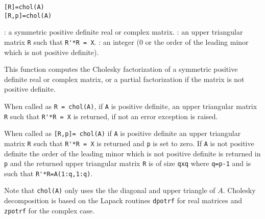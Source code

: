 
\begin{mandesc}
\end{mandesc}

\begin{calling_sequence}
\begin{verbatim}
[R]=chol(A)
[R,p]=chol(A)
\end{verbatim}
\end{calling_sequence}
\begin{parameters}
  \begin{varlist}
    : a symmetric positive definite real or complex matrix. 
    : an upper triangular matrix \verb+R+ such that \verb+R'*R = X+.
    : an integer (0 or the order of the leading minor which is 
not positive definite).
  \end{varlist}
\end{parameters}

\begin{mandescription}
This function computes the Cholesky factorization of a symmetric positive 
definite real or complex matrix, or a partial factorization if the matrix is not 
positive definite.

When called as \verb+R = chol(A)+, if \verb+A+ is positive definite, an upper triangular 
matrix \verb+R+ such that \verb+R'*R = X+ is returned, if not an error exception is 
raised.

When called as \verb+[R,p]= chol(A)+ if \verb+A+ is positive definite an upper triangular 
matrix \verb+R+ such that \verb+R'*R = X+ is returned and \verb+p+ is set to zero. 
If \verb+A+ is not positive definite the order of the leading minor which is 
not positive definite is returned in \verb+p+ and the returned upper triangular matrix \verb+R+ is 
of size \verb+qxq+ where \verb+q=p-1+ and is such that \verb+R'*R=A(1:q,1:q)+.

Note that \verb+chol(A)+ only uses the the diagonal and upper triangle of $A$. 
Cholesky decomposition is based on the Lapack routines \verb+dpotrf+ for real 
matrices and \verb+zpotrf+ for the complex case.
\end{mandescription}

